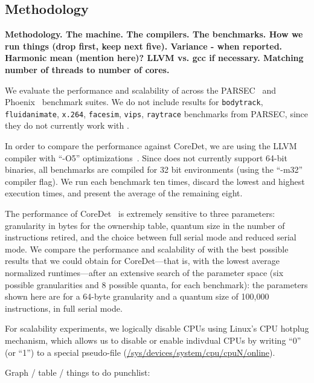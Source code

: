 \subsection{Methodology}

\textbf{Methodology. The machine. The compilers. The benchmarks. How we run
things (drop first, keep next five). Variance - when reported.
Harmonic mean (mention here)? LLVM vs. gcc if necessary. Matching
number of threads to number of cores.}

We evaluate the performance and scalability of \dthreads{} across the
PARSEC~\cite{parsec} and Phoenix~\cite{phoenix-hpca} benchmark suites.
We do not include results for \texttt{bodytrack}, \texttt{fluidanimate}, \texttt{x.264}, 
\texttt{facesim}, \texttt{vips}, \texttt{raytrace} benchmarks from PARSEC, 
since they do not currently work with \dthreads{}.

In order to compare the performance against CoreDet, we are using the
LLVM compiler with ``-O5''
optimizations~\cite{LLVM:CGO04}. Since \dthreads{} does not currently
support 64-bit binaries, all benchmarks are compiled for 32 bit
environments (using the ``-m32'' compiler flag). We run each benchmark
ten times, discard the lowest and highest execution times, and present the
average of the remaining eight.

The performance of CoreDet~\cite{Bergan:2010:CCR:1736020.1736029} is
extremely sensitive to three parameters: granularity in bytes for the
ownership table, quantum size in the number of instructions retired,
and the choice between full serial mode and reduced serial mode. We
compare the performance and scalability of \dthreads{} with the best
possible results that we could obtain for CoreDet---that is, with the
lowest average normalized runtimes---after an extensive search of the
parameter space (six possible granularities and 8 possible quanta, for
each benchmark): the parameters shown here are for a 64-byte
granularity and a quantum size of 100,000 instructions, in full serial
mode.
 
For scalability experiments, we logically disable CPUs using Linux's
CPU hotplug mechanism, which allows us to disable or enable indivdual
CPUs by writing ``0'' (or ``1'') to a special pseudo-file
(\url{/sys/devices/system/cpu/cpuN/online}).

Graph / table / things to do punchlist:

